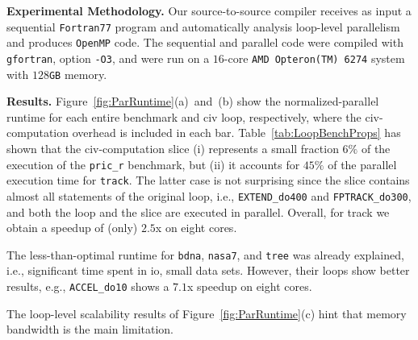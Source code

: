 \documentclass{sig-alternate}
\begin{document}


{\bf Experimental Methodology.} Our source-to-source compiler receives as
input a sequential {\tt Fortran77} program and automatically analysis loop-level 
parallelism and produces {\tt OpenMP} code.  The sequential and parallel 
code were compiled with {\tt gfortran}, option {\tt -O3}, and were run on 
a $16$-core {\tt AMD Opteron(TM) 6274} system with $128${\tt GB} memory. 
%

\enlargethispage{\baselineskip}

\vspace{1ex}

{\bf Results.} Figure~\ref{fig:ParRuntime}(a)~and~(b) show
the normalized-parallel runtime for each entire benchmark 
and {\sc civ} loop, respectively, where the {\sc civ}-computation
overhead is included in each bar.
%
Table~\ref{tab:LoopBenchProps} has shown that the {\sc civ}-computation slice 
(i) represents a small fraction $6\%$ of the execution of the 
{\tt pric\_r} benchmark,
but (ii) it accounts for $45\%$ of the parallel execution time for {\tt track}.
The latter case is not surprising since the slice contains almost all statements 
of the original loop, i.e., {\tt EXTEND\_do400} and {\tt FPTRACK\_do300}, 
and both the loop and the slice are executed in parallel.    
Overall, for track we obtain a speedup of (only) $2.5$x on eight cores.


The less-than-optimal runtime for {\tt bdna}, {\tt nasa7}, and 
{\tt tree} was already explained, i.e., significant time spent in {\sc io},
small data sets. However, their loops show better results,
e.g., {\tt ACCEL\_do10} shows a  $7.1$x speedup on eight cores. %

The loop-level scalability results of Figure~\ref{fig:ParRuntime}(c) 
hint that memory bandwidth is the main limitation. 
\end{document}

